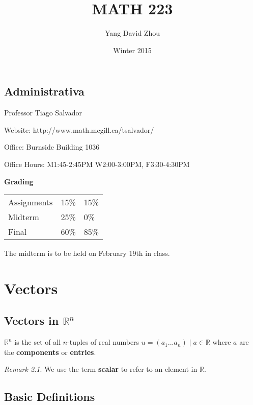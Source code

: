 \documentclass{report}
\theoremstyle{definition}
\theoremstyle{remark}
\newtheorem{_rem}{Remark}[section]
\begin{document}
 
\title{MATH 223} 
\author{Yang David Zhou}
\date{Winter 2015}
\maketitle

\section{Administrativa}

\raggedright

Professor Tiago Salvador \newline

Website: http://www.math.mcgill.ca/tsalvador/ \newline

Office: Burnside Building 1036

Office Hours: M1:45-2:45PM W2:00-3:00PM, F3:30-4:30PM \newline

\textbf{Grading}

\begin{tabular}{ l l l }
  Assignments & 15\% & 15\% \\
  Midterm     & 25\% &  0\% \\
  Final       & 60\% & 85\% \\
\end{tabular} \newline

The midterm is to be held on February 19th in class.

\chapter{Vectors}

\section[Vectors in Rn]{Vectors in \(\mathbb{R}^n\)}

\(\mathbb{R}^n\) is the set of all \(n\)-tuples of real numbers \(u=(a_1 ... a_n) \mid a\in \mathbb{R}\) where \(a\) are the \textbf{components} or \textbf{entries}.

\begin{_rem}
We use the term \textbf{scalar} to refer to an element in \(\mathbb{R}\).
\end{_rem}

\section{Basic Definitions}
\end{document}
